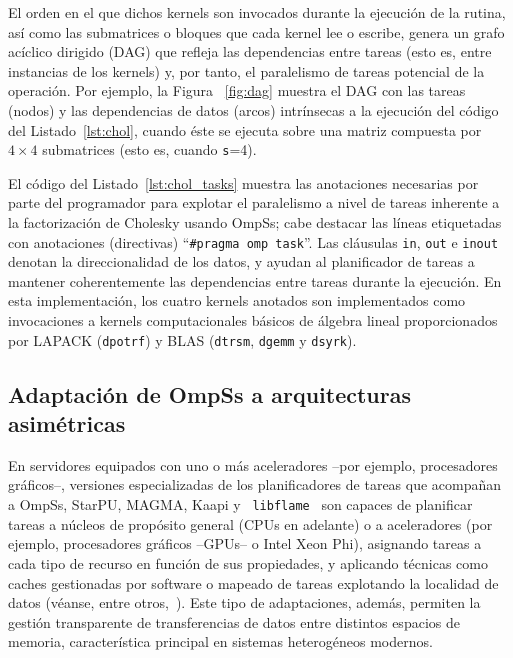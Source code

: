 El orden en el que dichos kernels son invocados durante la ejecución de la
rutina, así como las submatrices o bloques que cada kernel lee o escribe,
genera un grafo acíclico dirigido (DAG) que refleja las dependencias entre
tareas (esto es, entre instancias de los kernels) y, por tanto, el
paralelismo de tareas potencial de la operación.  Por ejemplo, la Figura
~\ref{fig:dag} muestra el DAG con las tareas (nodos) y las dependencias de
datos (arcos) intrínsecas a la ejecución del código del Listado~\ref{lst:chol}, cuando éste se ejecuta sobre una matriz compuesta
por $4 \times 4$ submatrices (esto es, cuando {\tt s}=4).

El código del Listado~\ref{lst:chol_tasks} muestra las anotaciones necesarias por parte del programador para explotar
el paralelismo a nivel de tareas inherente a la factorización de Cholesky usando OmpSs; cabe destacar las líneas etiquetadas
con  anotaciones (directivas) ``{\tt \#pragma omp task}''.
Las cláusulas {\tt in}, {\tt out} e {\tt inout} denotan la direccionalidad de los datos, y ayudan al planificador
de tareas a mantener coherentemente las dependencias entre tareas durante la ejecución. 
En esta implementación, los cuatro kernels anotados son implementados como invocaciones a 
kernels computacionales básicos de álgebra lineal proporcionados por LAPACK
({\tt dpotrf}) y BLAS ({\tt dtrsm}, {\tt dgemm} y {\tt dsyrk}).



\subsection{Adaptación de OmpSs a arquitecturas asimétricas}
\label{s3:botlev}

En servidores equipados con uno o más aceleradores --por ejemplo,
procesadores gráficos--, versiones especializadas de los planificadores de
tareas que acompañan a OmpSs, StarPU, MAGMA, Kaapi y {\tt
  libflame}~\cite{libflameref} son capaces de planificar tareas a núcleos
de propósito general (CPUs en adelante) o a aceleradores (por ejemplo,
procesadores gráficos --GPUs-- o Intel Xeon Phi), asignando tareas a cada
tipo de recurso en función de sus propiedades, y aplicando técnicas como
caches gestionadas por software o mapeado de tareas explotando la localidad
de datos (véanse, entre
otros,~\cite{Quintana:2008:PMA,CPE:CPE1463,Augonnet:2011:SUP:1951453.1951454,5470941,Gautier:2013:XRS:2510661.2511383}). Este
tipo de adaptaciones, además, permiten la gestión transparente de
transferencias de datos entre distintos espacios de memoria, característica
principal en sistemas heterogéneos modernos.





